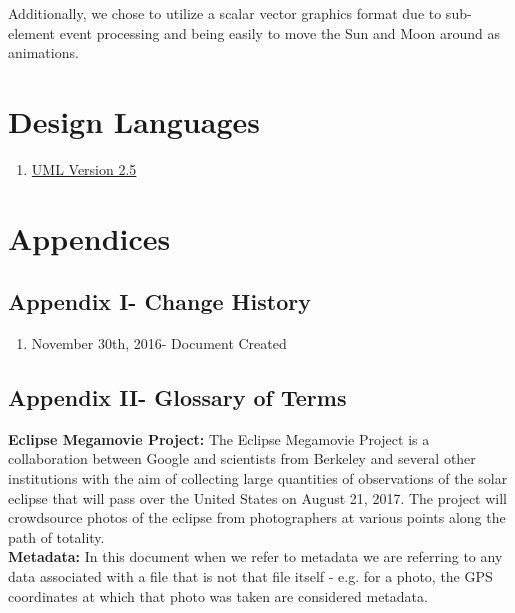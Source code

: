 \documentclass[10pt, onecolumn, draftclsnofoot, letterpaper, compsoc]{IEEEtran}
\begin{document}
Additionally, we chose to utilize a scalar vector graphics
format due to sub-element event processing and being easily
to move the Sun and Moon around as animations. \\

\section{Design Languages}

\begin{enumerate}
    \item \href{http://www.omg.org/spec/UML/2.5}{UML Version 2.5}
\end{enumerate}


\newpage
\section{Appendices}

\subsection{Appendix I- Change History}

\begin{enumerate}
\item November 30th, 2016- Document Created \\
\end{enumerate}

\subsection{Appendix II- Glossary of Terms}

\textbf{Eclipse Megamovie Project:}
The Eclipse Megamovie Project is a collaboration between Google
and scientists from Berkeley and several other institutions with the
aim of collecting large quantities of observations of the solar eclipse
that will pass over the United States on August 21, 2017. The project
will crowdsource photos of the eclipse from photographers at various
points along the path of totality. \\

\noindent \textbf{Metadata:} In this document when we refer to metadata we are
referring to any data associated with a file that is not that file itself -
e.g. for a photo, the GPS coordinates at which that photo was taken are
considered metadata.\\
\end{document}
